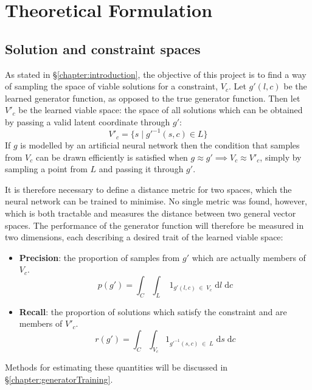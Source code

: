 \documentclass[../../main.tex]{subfiles}
\begin{document}
\chapter{Theoretical Formulation} \label{chapter:theoreticalFormulation}

\section{Solution and constraint spaces} \label{section:solutionAndConstraintSpaces}

As stated in \S\ref{chapter:introduction}, the objective of this project is to find a way of sampling the space of viable solutions for a constraint, $V_c$.
Let $g'(l,c)$ be the learned generator function, as opposed to the true generator function.
Then let $V'_c$ be the learned viable space: the space of all solutions which can be obtained by passing a valid latent coordinate through $g'$:
\begin{equation}
	V'_c=\{s\;|\;g'^{-1}(s,c)\in L\}
\end{equation}
If $g$ is modelled by an artificial neural network then the condition that samples from $V_c$ can be drawn efficiently is satisfied when $g\approx g'\implies V_c\approx V'_c$, simply by sampling a point from $L$ and passing it through $g'$.

It is therefore necessary to define a distance metric for two spaces, which the neural network can be trained to minimise.
No single metric was found, however, which is both tractable and measures the distance between two general vector spaces.
The performance of the generator function will therefore be measured in two dimensions, each describing a desired trait of the learned viable space:
\begin{itemize}
    \item[] \textbf{Precision}: the proportion of samples from $g'$ which are actually members of $V_c$.
	\begin{equation}
		p(g')=\int_{C}\int_{L}\;1_{g'(l, c)\;\in\;V_c}\;\mathrm{d}l\;\mathrm{d}c
	\end{equation}
    \item[] \textbf{Recall}: the proportion of solutions which satisfy the constraint and are members of $V'_c$.
	\begin{equation}
		r(g')=\int_{C}\int_{V_c}1_{g'^{-1}(s,c)\;\in\;L}\;\mathrm{d}s\;\mathrm{d}c
	\end{equation}
\end{itemize}
Methods for estimating these quantities will be discussed in \S\ref{chapter:generatorTraining}.
\end{document}
